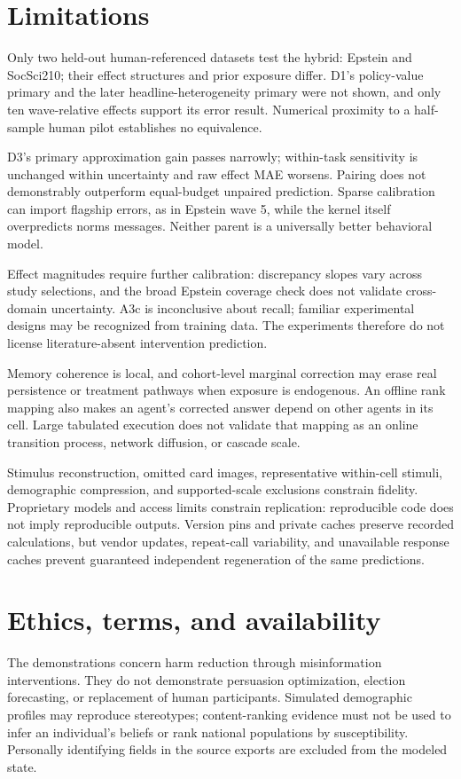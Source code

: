 \documentclass[11pt]{article}
\begin{document}
\section{Limitations}
Only two held-out human-referenced datasets test the hybrid: Epstein and SocSci210; their effect structures and prior exposure differ. D1's policy-value primary and the later headline-heterogeneity primary were not shown, and only ten wave-relative effects support its error result. Numerical proximity to a half-sample human pilot establishes no equivalence.

D3's primary approximation gain passes narrowly; within-task sensitivity is unchanged within uncertainty and raw effect MAE worsens. Pairing does not demonstrably outperform equal-budget unpaired prediction. Sparse calibration can import flagship errors, as in Epstein wave 5, while the kernel itself overpredicts norms messages. Neither parent is a universally better behavioral model.

Effect magnitudes require further calibration: discrepancy slopes vary across study selections, and the broad Epstein coverage check does not validate cross-domain uncertainty. A3c is inconclusive about recall; familiar experimental designs may be recognized from training data. The experiments therefore do not license literature-absent intervention prediction.

Memory coherence is local, and cohort-level marginal correction may erase real persistence or treatment pathways when exposure is endogenous. An offline rank mapping also makes an agent's corrected answer depend on other agents in its cell. Large tabulated execution does not validate that mapping as an online transition process, network diffusion, or cascade scale.

Stimulus reconstruction, omitted card images, representative within-cell stimuli, demographic compression, and supported-scale exclusions constrain fidelity. Proprietary models and access limits constrain replication: reproducible code does not imply reproducible outputs. Version pins and private caches preserve recorded calculations, but vendor updates, repeat-call variability, and unavailable response caches prevent guaranteed independent regeneration of the same predictions.

\section{Ethics, terms, and availability}
The demonstrations concern harm reduction through misinformation interventions. They do not demonstrate persuasion optimization, election forecasting, or replacement of human participants. Simulated demographic profiles may reproduce stereotypes; content-ranking evidence must not be used to infer an individual's beliefs or rank national populations by susceptibility. Personally identifying fields in the source exports are excluded from the modeled state.
\end{document}
